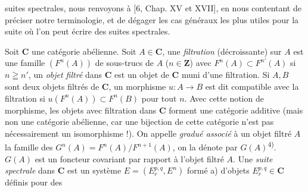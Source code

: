 
\noindent suites spectrales, nous renvoyons à [6, Chap. XV et XVII], en nous
contentant de préciser notre terminologie, et de dégager les cas généraux les
plus utiles pour la suite où l'on peut écrire des suites spectrales.

Soit $\mathbf{C}$ une catégorie abélienne. Soit $A\in \mathbf{C}$, une \textit{filtration}
(décroissante) sur $A$ est une famille $(F^n(A))$ de sous-trucs de $A$
($n\in\mathbf Z$) avec $F^n(A)\subset F^{n'}(A)$ si $n\geqq n'$, un
\textit{objet filtré} dans $\mathbf{C}$ est un objet de $\mathbf{C}$ muni d'une filtration. Si
$A,B$ sont deux objets filtrés de $\mathbf{C}$, un morphisme $u:A\to B$ est
dit compatible avec la filtration si $u(F^n(A))\subset F^n(B)$ pour tout $n$.
Avec cette notion de morphisme, les objets avec filtration dans $\mathbf{C}$ forment une
catégorie additive (mais non une catégorie abélienne, car une bijection de
cette catégorie n'est pas nécessairement un isomorphisme !).
On appelle \textit{gradué associé} à un objet filtré $A$ la famille des
$G^n(A)=F^n(A)/F^{n+1}(A)$, on la dénote par $G(A)$\textsuperscript{4)}. $G(A)$ est
un foncteur covariant par rapport à
l'objet filtré $A$.
Une \textit{suite spectrale} dans $\mathbf{C}$ est un système
$E=(E_r^{p,q},E^n)$ formé a) d'objets $E_r^{p,q}\in \mathbf{C}$ définis pour des
